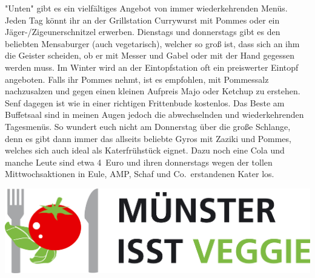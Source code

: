 \begin{multicols*}{2}
\begin{center}
\end{center}

"Unten" gibt es ein vielfältiges Angebot von immer wiederkehrenden Menüs.
Jeden Tag könnt ihr an der Grillstation Currywurst mit Pommes oder ein Jäger-/Zigeunerschnitzel erwerben.
Dienstags und donnerstags gibt es den beliebten Mensaburger (auch vegetarisch), welcher so groß ist, dass sich an ihm die Geister scheiden, ob er mit Messer und Gabel oder mit der Hand gegessen werden muss.
Im Winter wird an der Eintopfstation oft ein preiswerter Eintopf angeboten.
Falls ihr Pommes nehmt, ist es empfohlen, mit Pommessalz nachzusalzen und gegen einen kleinen Aufpreis Majo oder Ketchup zu erstehen.
Senf dagegen ist wie in einer richtigen Frittenbude kostenlos.
Das Beste am Buffetsaal sind in meinen Augen jedoch die abwechselnden und wiederkehrenden Tagesmenüs.
So wundert euch nicht am Donnerstag über die große Schlange, denn es gibt dann immer das allseits beliebte Gyros mit Zaziki und Pommes, welches sich auch ideal als Katerfrühstück eignet.
Dazu noch eine Cola und manche Leute sind etwa 4~Euro und ihren donnerstags wegen der tollen Mittwochsaktionen in Eule, AMP, Schaf und Co.\ erstandenen Kater los.

\includegraphics[width=\columnwidth]{res/muenster_isst_veggie.png}


\end{multicols*}
